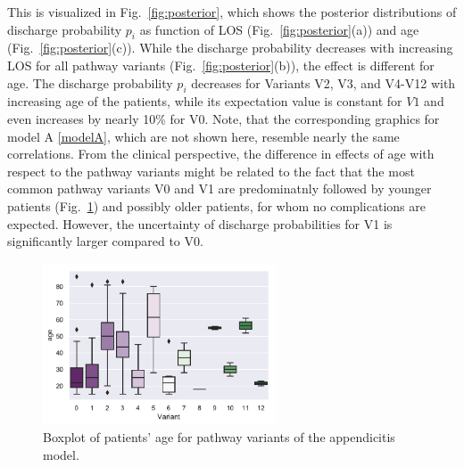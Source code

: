 This is visualized in Fig.~\ref{fig:posterior}, which shows the posterior distributions of discharge probability $p_i$ as function of LOS (Fig.~\ref{fig:posterior}(a)) and age (Fig.~\ref{fig:posterior}(c)). While the discharge probability decreases with increasing LOS for all pathway variants (Fig.~\ref{fig:posterior}(b)), the effect is different for age. 
The discharge probability $p_i$ decreases for Variants V2, V3, and V4-V12 with increasing age of the patients, while its expectation value is constant for $V1$ and even increases by nearly 10\% for V0. Note, that the corresponding graphics for model A \eqref{modelA}, which are not shown here, resemble nearly the same correlations. 
From the clinical perspective, the difference in effects of age with
respect to the pathway variants might be related to the fact that the
most common pathway variants V0 and V1 are predominatnly followed by younger patients (Fig.~\ref{Fig:boxplot}) and possibly older patients, for whom no complications are expected. 
However, the uncertainty of discharge probabilities for V1 is significantly larger compared to V0.

\begin{figure}
  \centering
  \includegraphics[width=0.618\textwidth]{images/DS19fA0_Lin20180730a__boxplot_age_variant.pdf}
\caption{Boxplot of patients' age for pathway variants of the
  appendicitis model.}
\label{Fig:boxplot}
\end{figure}
%

